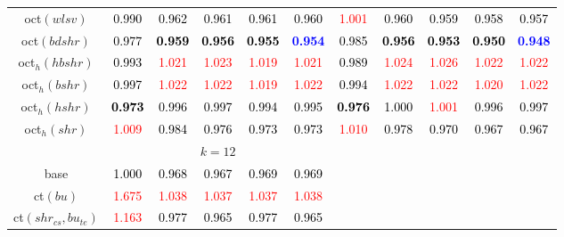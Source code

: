 \begin{tabular}[t]{c|>{}cccc>{}c|ccccc}
oct$(wlsv)$ & \textcolor{black}{0.990} & \textcolor{black}{0.962} & \textcolor{black}{0.961} & \textcolor{black}{0.961} & \textcolor{black}{0.960} & \textcolor{red}{1.001} & \textcolor{black}{0.960} & \textcolor{black}{0.959} & \textcolor{black}{0.958} & \textcolor{black}{0.957}\\
oct$(bdshr)$ & \textcolor{black}{0.977} & \textcolor{black}{\textbf{0.959}} & \textcolor{black}{\textbf{0.956}} & \textcolor{black}{\textbf{0.955}} & \textcolor{blue}{\textbf{0.954}} & \textcolor{black}{0.985} & \textcolor{black}{\textbf{0.956}} & \textcolor{black}{\textbf{0.953}} & \textcolor{black}{\textbf{0.950}} & \textcolor{blue}{\textbf{0.948}}\\
oct$_h(hbshr)$ & \textcolor{black}{0.993} & \textcolor{red}{1.021} & \textcolor{red}{1.023} & \textcolor{red}{1.019} & \textcolor{red}{1.021} & \textcolor{black}{0.989} & \textcolor{red}{1.024} & \textcolor{red}{1.026} & \textcolor{red}{1.022} & \textcolor{red}{1.022}\\
oct$_h(bshr)$ & \textcolor{black}{0.997} & \textcolor{red}{1.022} & \textcolor{red}{1.022} & \textcolor{red}{1.019} & \textcolor{red}{1.022} & \textcolor{black}{0.994} & \textcolor{red}{1.022} & \textcolor{red}{1.022} & \textcolor{red}{1.020} & \textcolor{red}{1.022}\\
oct$_h(hshr)$ & \textcolor{black}{\textbf{0.973}} & \textcolor{black}{0.996} & \textcolor{black}{0.997} & \textcolor{black}{0.994} & \textcolor{black}{0.995} & \textcolor{black}{\textbf{0.976}} & \textcolor{black}{1.000} & \textcolor{red}{1.001} & \textcolor{black}{0.996} & \textcolor{black}{0.997}\\
oct$_h(shr)$ & \textcolor{red}{1.009} & \textcolor{black}{0.984} & \textcolor{black}{0.976} & \textcolor{black}{0.973} & \textcolor{black}{0.973} & \textcolor{red}{1.010} & \textcolor{black}{0.978} & \textcolor{black}{0.970} & \textcolor{black}{0.967} & \textcolor{black}{0.967}\\
\addlinespace[0.3em]
\multicolumn{1}{c}{} & \multicolumn{5}{c}{\textbf{$k = 12$}} & \multicolumn{5}{c}{}\\
base & \textcolor{black}{1.000} & \textcolor{black}{0.968} & \textcolor{black}{0.967} & \textcolor{black}{0.969} & \textcolor{black}{0.969} &  &  &  &  & \\
ct$(bu)$ & \textcolor{red}{1.675} & \textcolor{red}{1.038} & \textcolor{red}{1.037} & \textcolor{red}{1.037} & \textcolor{red}{1.038} &  &  &  &  & \\
ct$(shr_{cs}, bu_{te})$ & \textcolor{red}{1.163} & \textcolor{black}{0.977} & \textcolor{black}{0.965} & \textcolor{black}{0.977} & \textcolor{black}{0.965} &  &  &  &  & \\

\end{tabular}
